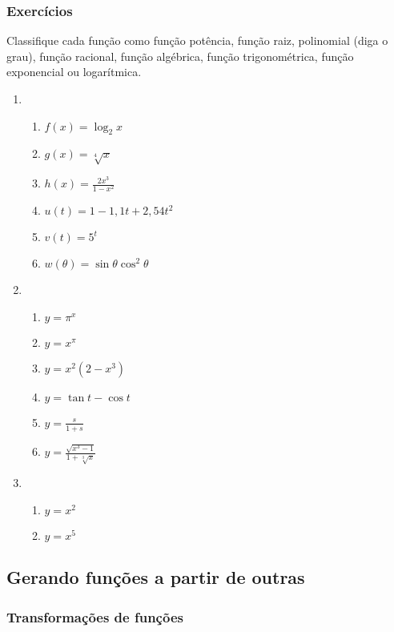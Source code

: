 \subsubsection{Exercícios}

Classifique cada função como função potência, função raiz, polinomial (diga o grau), função racional, função algébrica, função trigonométrica, função exponencial ou logarítmica.

\begin{enumerate}[label=\textbf{\arabic*.},leftmargin=*]
  \item \begin{enumerate}
    \item $f(x)=\log_2x$
    \item $g(x)=\sqrt[4]{x}$
    \item $h(x)=\frac{2x^3}{1-x^2}$
    \item $u(t) = 1-1,1t + 2,54t^2$
    \item $v(t) = 5^t$
    \item $w(\theta) = \sin\theta \cos^2\theta$
  \end{enumerate}
  \item \begin{enumerate}
    \item $y = \pi^x$
    \item $y = x^\pi$
    \item $y = x^2(2-x^3)$
    \item $y = \tan t - \cos t$
    \item $y = \frac{s}{1+s}$
    \item $y = \frac{\sqrt{x^3-1}}{1+\sqrt[3]{x}}$
  \end{enumerate}
  \item \begin{enumerate}
    \item $y=x^2$
    \item $y=x^5$
  \end{enumerate}
\end{enumerate}


\subsection{Gerando funções a partir de outras}

\subsubsection{Transformações de funções}

